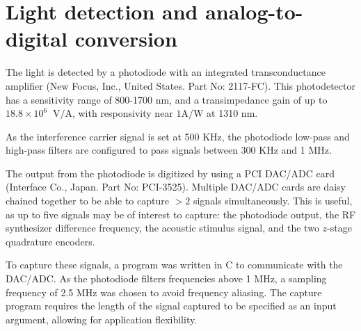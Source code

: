\section{Light detection and analog-to-digital conversion}

The light is detected by a photodiode with an integrated transconductance amplifier (New Focus, Inc., United States. Part No: 2117-FC). This photodetector has a sensitivity range of 800-1700 nm, and a transimpedance gain of up to $18.8 \times 10^6 \;\; \mathrm{V}/\mathrm{A}$, with responsivity near $1 \mathrm{A}/\mathrm{W}$ at 1310 nm. %

As the interference carrier signal is set at 500 KHz, the photodiode low-pass and high-pass filters are configured to pass signals between 300 KHz and 1 MHz.



The output from the photodiode is digitized by using a PCI DAC/ADC card (Interface Co., Japan. Part No: PCI-3525). Multiple DAC/ADC cards are daisy chained together to be able to capture $>2$ signals simultaneously. This is useful, as up to five signals may be of interest to capture: the photodiode output, the RF synthesizer difference frequency, the acoustic stimulus signal, and the two $z$-stage quadrature encoders.


To capture these signals, a program was written in C to communicate with the DAC/ADC. As the photodiode filters frequencies above 1 MHz, a sampling frequency of 2.5 MHz was chosen to avoid frequency aliasing. The capture program requires the length of the signal captured to be specified as an input argument, allowing for application flexibility.

